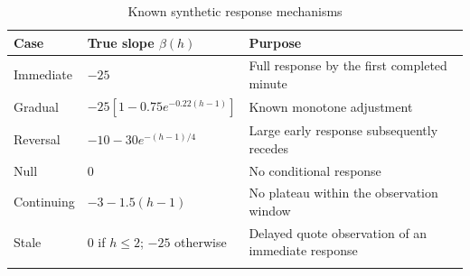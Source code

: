 \begin{table}[htbp]
\centering
{\fontsize{10}{12}\selectfont\renewcommand{\arraystretch}{1.22}\setlength{\tabcolsep}{4pt}
\begin{tabularx}{\linewidth}{@{}L{24mm}L{64mm}X@{}}
\toprule{}
\textbf{Case} & \textbf{True slope $\beta(h)$} & \textbf{Purpose} \\ \midrule
Immediate & $-25$ & Full response by the first completed minute \\ \hline
Gradual & $-25[1-0.75e^{-0.22(h-1)}]$ & Known monotone adjustment \\ \hline
Reversal & $-10-30e^{-(h-1)/4}$ & Large early response subsequently recedes \\ \hline
Null & $0$ & No conditional response \\ \hline
Continuing & $-3-1.5(h-1)$ & No plateau within the observation window \\ \hline
Stale & $0$ if $h\leq2$; $-25$ otherwise & Delayed quote observation of an immediate response \\ \hline
{}\bottomrule\end{tabularx}}
\caption[Known synthetic response mechanisms]{Known synthetic response mechanisms}\label{tab:synthetic-design}
\end{table}
